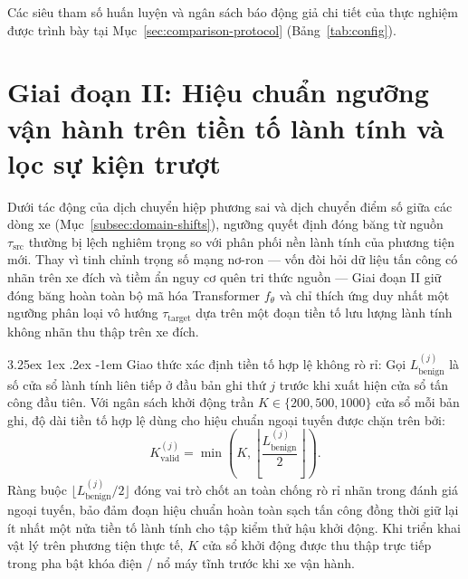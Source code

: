 \documentclass[12pt, a4paper, reqno, oneside]{book}
\makeatletter
\renewcommand\paragraph{\@startsection{paragraph}{5}{\z@}%
  {3.25ex \@plus1ex \@minus.2ex}%
  {-1em}%
  {\normalfont\normalsize\bfseries}}
\makeatother
\begin{document}
Các siêu tham số huấn luyện và ngân sách báo động giả chi tiết của thực nghiệm được trình bày tại Mục~\ref{sec:comparison-protocol} (Bảng~\ref{tab:config}).\par\medskip

\section{Giai đoạn II: Hiệu chuẩn ngưỡng vận hành trên tiền tố lành tính và lọc sự kiện trượt}\label{sec:method-calibration}
Dưới tác động của dịch chuyển hiệp phương sai và dịch chuyển điểm số giữa các dòng xe (Mục~\ref{subsec:domain-shifts}), ngưỡng quyết định đóng băng từ nguồn $\tau_{\text{src}}$ thường bị lệch nghiêm trọng so với phân phối nền lành tính của phương tiện mới. Thay vì tinh chỉnh trọng số mạng nơ-ron --- vốn đòi hỏi dữ liệu tấn công có nhãn trên xe đích và tiềm ẩn nguy cơ quên tri thức nguồn --- Giai đoạn II giữ đóng băng hoàn toàn bộ mã hóa Transformer $f_\theta$ và chỉ thích ứng duy nhất một ngưỡng phân loại vô hướng $\tau_{\text{target}}$ dựa trên một đoạn tiền tố lưu lượng lành tính không nhãn thu thập trên xe đích.

\paragraph{Giao thức xác định tiền tố hợp lệ không rò rỉ:} Gọi $L_{\text{benign}}^{(j)}$ là số cửa sổ lành tính liên tiếp ở đầu bản ghi thứ $j$ trước khi xuất hiện cửa sổ tấn công đầu tiên. Với ngân sách khởi động trần $K \in \{200, 500, 1000\}$ cửa sổ mỗi bản ghi, độ dài tiền tố hợp lệ dùng cho hiệu chuẩn ngoại tuyến được chặn trên bởi:
\begin{equation}
K_{\text{valid}}^{(j)} = \min\left(K, \left\lfloor \frac{L_{\text{benign}}^{(j)}}{2} \right\rfloor\right).
\end{equation}
Ràng buộc $\lfloor L_{\text{benign}}^{(j)} / 2 \rfloor$ đóng vai trò chốt an toàn chống rò rỉ nhãn trong đánh giá ngoại tuyến, bảo đảm đoạn hiệu chuẩn hoàn toàn sạch tấn công đồng thời giữ lại ít nhất một nửa tiền tố lành tính cho tập kiểm thử hậu khởi động. Khi triển khai vật lý trên phương tiện thực tế, $K$ cửa sổ khởi động được thu thập trực tiếp trong pha bật khóa điện / nổ máy tĩnh trước khi xe vận hành.
\end{document}
